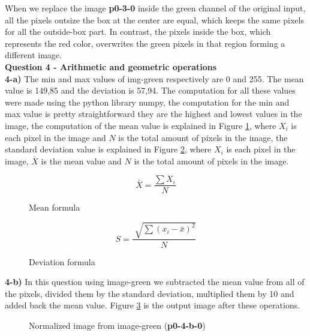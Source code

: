 \documentclass[12pt,a4paper]{article}
\begin{document}
When we replace the image \textbf{p0-3-0} inside the green channel of the original input, all the pixels outsize the box at the center are equal, which keeps the same pixels for all the outside-box part. In contrast, the pixels inside the box, which represents the red color, overwrites the green pixels in that region forming a different image. \\


\textbf{Question 4 - Arithmetic and geometric operations} \\

\textbf{4-a) } The min and max values of img-green respectively are 0 and 255.	The mean value is 149,85 and the deviation is 57,94. The computation for all these values were made using the python library numpy, the computation for the min and max value is pretty straightforward they are the highest and lowest values in the image, the computation of the mean value is explained in Figure \ref{eq:mean}, where $X_i$ is each pixel in the image and $N$ is the total amount of pixels in the image, the standard deviation value is explained in Figure \ref{eq:deviation}, where \textbf{$X_i$} is each pixel in the image, $\bar X$ is the mean value and $N$ is the total amount of pixels in the image.

\begin{figure}[!h]
	\centering
	\[ \bar X = \frac{\sum X_i}{N} \]
	\caption{Mean formula}
    \label{eq:mean}
\end{figure}

\begin{figure}[!h]
	\centering
	\[ S = \frac{\sqrt[]{\sum {(x_i - \bar{x})^2}}}{N} \]
	\caption{Deviation formula}
    \label{eq:deviation}
\end{figure}

\textbf{4-b) } In this question using image-green we subtracted the mean value from all of the pixels, divided them by the standard deviation, multiplied them by 10 and added back the mean value. Figure \ref{fig:p0-4-b-0} is the output image after these operations.


\begin{figure}[!h]
	\centering
	{%
		\setlength{\fboxsep}{1pt}%
		\setlength{\fboxrule}{1pt}%
	}%
	\caption{Normalized image from image-green (\textbf{p0-4-b-0})}
	\label{fig:p0-4-b-0}
\end{figure}
\end{document}
